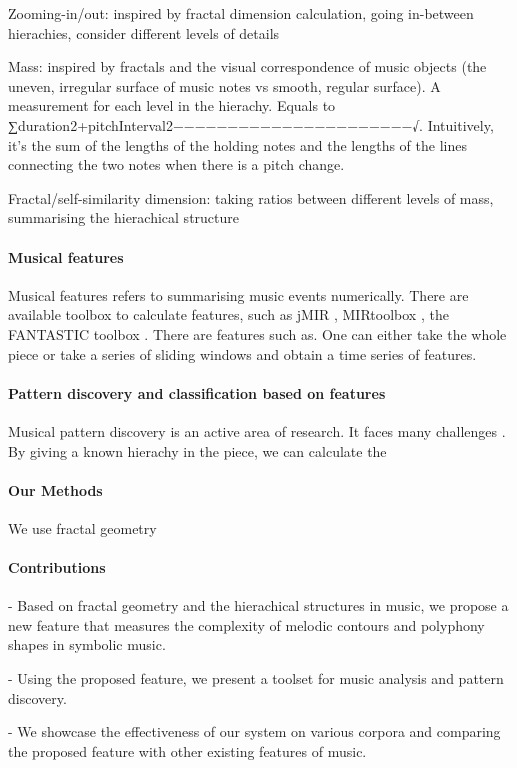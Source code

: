 \documentclass[acmsmall,review,anonymous]{acmart}\settopmatter{printfolios=true,printccs=false,printacmref=false}
\begin{document}
Zooming-in/out: inspired by fractal dimension calculation, going in-between
hierachies, consider different levels of details

Mass: inspired by fractals and the visual correspondence of music objects (the
uneven, irregular surface of music notes vs smooth, regular surface). A
measurement for each level in the hierachy. Equals to
∑duration2+pitchInterval2−−−−−−−−−−−−−−−−−−−−−−√. Intuitively, it's the sum of
the lengths of the holding notes and the lengths of the lines connecting the two
notes when there is a pitch change.

Fractal/self-similarity dimension: taking ratios between different levels of
mass, summarising the hierachical structure


\paragraph{Musical features}
Musical features refers to summarising music events numerically. There are
available toolbox to calculate features, such as jMIR \cite{}, MIRtoolbox \cite{}, the FANTASTIC
toolbox \cite{}. There are features such as.  One can either
take the whole piece or take a series of sliding windows and obtain a time
series of features. 

\paragraph{Pattern discovery and classification based on features}
Musical pattern discovery is an active area of research. It faces many
challenges \cite{}. By giving a known hierachy in the piece, we can calculate the 

\paragraph{Our Methods}
We use fractal geometry 

\paragraph{Contributions}
- Based on fractal geometry and the hierachical structures in music, we propose a
new feature that measures the complexity of melodic contours and polyphony
shapes in symbolic music.

- Using the proposed feature, we present a toolset for music analysis and
pattern discovery.

- We showcase the effectiveness of our system on various
corpora and comparing the proposed feature with other existing features of music. 
\end{document}
